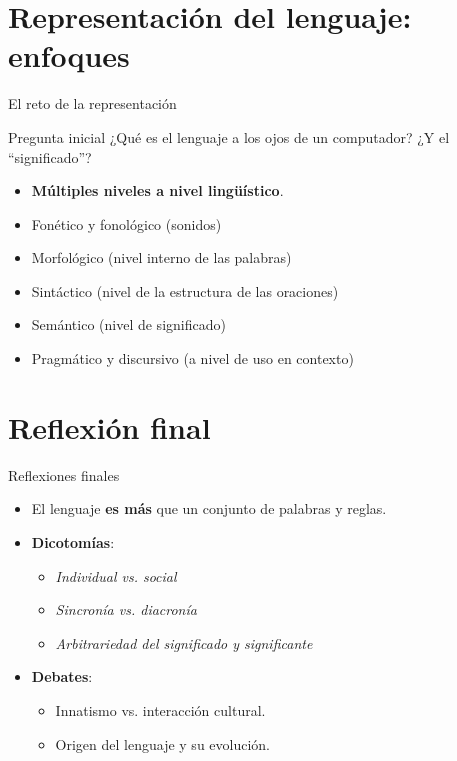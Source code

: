\documentclass[handout]{beamer}
\begin{document}
\section{Representación del lenguaje: enfoques}

\begin{frame}{El reto de la representación}
  \begin{block}{Pregunta inicial}
    ¿Qué es el lenguaje a los ojos de un computador? ¿Y el “significado”?
  \end{block}
  \begin{itemize}
    \item \textbf{Múltiples niveles a nivel lingüístico}.
    \item Fonético y fonológico (sonidos)
    \item Morfológico (nivel interno de las palabras)
    \item Sintáctico (nivel de la estructura de las oraciones)
    \item Semántico (nivel de significado)
    \item Pragmático y discursivo (a nivel de uso en contexto)
  \end{itemize}
  \end{frame}

\section{Reflexión final}

\begin{frame}{Reflexiones finales}
  \begin{itemize}
    \item El lenguaje \textbf{es más} que un conjunto de palabras y reglas.
    \item \textbf{Dicotomías}: 
      \begin{itemize}
        \item \textit{Individual vs. social}
        \item \textit{Sincronía vs. diacronía}
        \item \textit{Arbitrariedad del significado y significante}
      \end{itemize}
    \item \textbf{Debates}: 
      \begin{itemize}
        \item Innatismo vs. interacción cultural.
        \item Origen del lenguaje y su evolución.
      \end{itemize}
  \end{itemize}
\end{frame}
\end{document}
